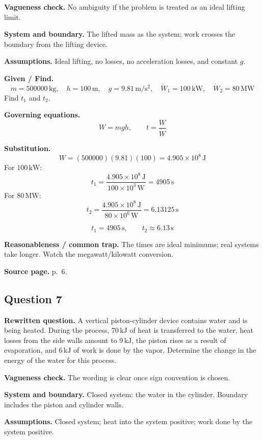 \textbf{Vagueness check.} No ambiguity if the problem is treated as an ideal lifting limit.

\textbf{System and boundary.} The lifted mass as the system; work crosses the boundary from the lifting device.

\textbf{Assumptions.} Ideal lifting, no losses, no acceleration losses, and constant $g$.

\textbf{Given / Find.}
\[
m=500000\,\mathrm{kg},\quad h=100\,\mathrm{m},\quad g=9.81\,\mathrm{m/s^2},\quad \dot W_1=100\,\mathrm{kW},\quad \dot W_2=80\,\mathrm{MW}
\]
Find $t_1$ and $t_2$.

\textbf{Governing equations.}
\[
W=mgh,\qquad t=\frac{W}{\dot W}
\]

\textbf{Substitution.}
\[
W=(500000)(9.81)(100)=4.905\times10^8\,\mathrm{J}
\]
For $100\,\mathrm{kW}$:
\[
t_1=\frac{4.905\times10^8\,\mathrm{J}}{100\times10^3\,\mathrm{W}}=4905\,\mathrm{s}
\]
For $80\,\mathrm{MW}$:
\[
t_2=\frac{4.905\times10^8\,\mathrm{J}}{80\times10^6\,\mathrm{W}}=6.13125\,\mathrm{s}
\]

\[
\boxed{t_1=4905\,\mathrm{s}},\qquad \boxed{t_2\approx6.13\,\mathrm{s}}
\]

\textbf{Reasonableness / common trap.} The times are ideal minimums; real systems take longer. Watch the megawatt/kilowatt conversion.

\textbf{Source page.} p.~6.

\subsection*{Question 7}

\textbf{Rewritten question.} A vertical piston-cylinder device contains water and is being heated. During the process, $70\,\mathrm{kJ}$ of heat is transferred to the water, heat losses from the side walls amount to $9\,\mathrm{kJ}$, the piston rises as a result of evaporation, and $6\,\mathrm{kJ}$ of work is done by the vapor. Determine the change in the energy of the water for this process.

\textbf{Vagueness check.} The wording is clear once sign convention is chosen.

\textbf{System and boundary.} Closed system: the water in the cylinder. Boundary includes the piston and cylinder walls.

\textbf{Assumptions.} Closed system; heat into the system positive; work done by the system positive.

